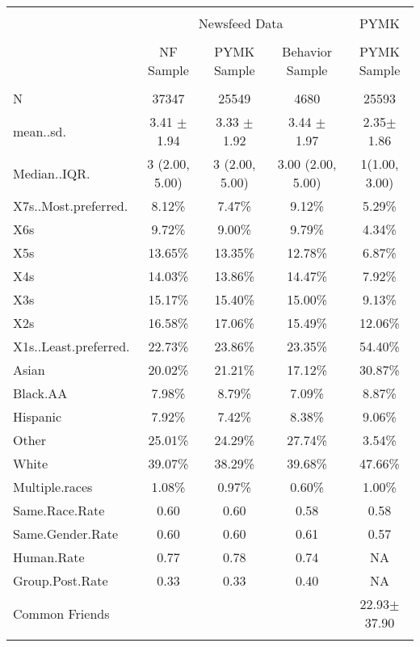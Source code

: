 
\begin{table}[!htbp] \centering 
  \caption{} 
  \label{tab:outcomesumstats} 
\begin{tabular}{@{\extracolsep{5pt}} lcccc} 
\\[-1.8ex]\hline 
\hline \\[-1.8ex] 
&\multicolumn{3}{c}{Newsfeed Data} &\multicolumn{1}{c}{PYMK} \\\cmidrule(lr){2-4}\cmidrule(lr){5-5}\\
 & NF Sample & PYMK Sample & Behavior Sample & PYMK Sample\\ 
\hline \\[-1.8ex] 
N & 37347 & 25549 & 4680 & 25593 \\ 
mean..sd. & 3.41 $\pm$ 1.94 & 3.33 $\pm$ 1.92 & 3.44 $\pm$ 1.97 & 2.35$\pm$1.86 \\ 
Median..IQR. & 3 (2.00, 5.00) & 3 (2.00, 5.00) & 3.00 (2.00, 5.00) & 1(1.00, 3.00) \\ 
X7s..Most.preferred. & 8.12\%   & 7.47\%   & 9.12\%   & 5.29\% \\ 
X6s & 9.72\%   & 9.00\%   & 9.79\%   & 4.34\% \\ 
X5s & 13.65\%   & 13.35\%   & 12.78\%   & 6.87\% \\ 
X4s & 14.03\%   & 13.86\%   & 14.47\%   & 7.92\% \\ 
X3s & 15.17\%   & 15.40\%   & 15.00\%   & 9.13\% \\ 
X2s & 16.58\%   & 17.06\%   & 15.49\%   & 12.06\% \\ 
X1s..Least.preferred. & 22.73\%   & 23.86\%   & 23.35\%   & 54.40\% \\ 
Asian & 20.02\%   & 21.21\%   & 17.12\%   & 30.87\%\\ 
Black.AA & 7.98\%   & 8.79\%   & 7.09\%   & 8.87\% \\ 
Hispanic & 7.92\%   & 7.42\%   & 8.38\%   & 9.06\% \\ 
Other & 25.01\%   & 24.29\%   & 27.74\%   & 3.54\% \\ 
White & 39.07\%   & 38.29\%   & 39.68\%   & 47.66\% \\ 
Multiple.races & 1.08\%   & 0.97\%   & 0.60\%  & 1.00\%\\ 
Same.Race.Rate & 0.60 & 0.60 & 0.58 & 0.58\\ 
Same.Gender.Rate & 0.60 & 0.60 & 0.61 & 0.57 \\ 
Human.Rate & 0.77 & 0.78 & 0.74 & NA\\ 
Group.Post.Rate & 0.33 & 0.33 & 0.40 & NA \\ 
Common Friends &  & & &  22.93$\pm$ 37.90 \\
\hline \\[-1.8ex] 
\end{tabular} 
\end{table} 